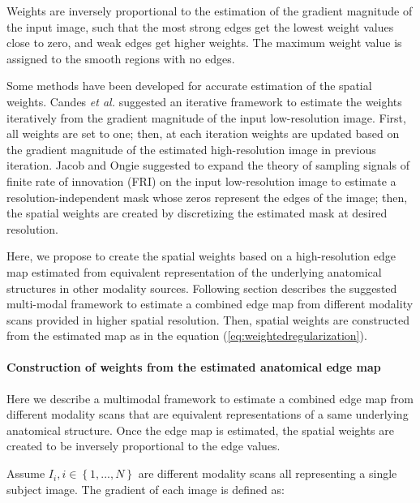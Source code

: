 Weights are inversely proportional to the estimation of the gradient magnitude of the input image, such that the most strong edges get the lowest weight values close to zero, and weak edges get higher weights. The maximum weight value is assigned to the smooth regions with no edges.

Some methods have been developed for accurate estimation of the spatial weights. 
Candes \emph{et al.} \cite{candes2008enhancing} suggested an iterative framework to estimate the weights iteratively from the gradient magnitude of the input low-resolution image. First, all weights are set to one; then, at each iteration weights are updated based on the gradient magnitude of the estimated high-resolution image in previous iteration.
Jacob and Ongie \cite{ongie2015} suggested to expand the theory of sampling signals of finite rate of innovation (FRI) on the input low-resolution image to estimate a resolution-independent mask whose zeros represent the edges of the image; then, the spatial weights are created by discretizing the estimated mask at desired resolution.

Here, we propose to create the spatial weights based on a high-resolution edge map estimated from equivalent representation of the underlying anatomical structures in other modality sources.
Following section describes the suggested multi-modal framework to estimate a combined edge map from different modality scans provided in higher spatial resolution. Then, spatial weights are constructed from the estimated map as in the equation (\ref{eq:weightedregularization}).

\paragraph{Construction of weights from the estimated anatomical edge map}
\label{section:estimateLabelMap}

Here we describe a multimodal framework to estimate a combined edge map from different modality scans that are equivalent representations of a same underlying anatomical structure. Once the edge map is estimated, the spatial weights are created to be inversely proportional to the edge values.

Assume $I_{i}, i\in \left \{ 1,...,N \right \}$ are different modality scans all representing a single subject image. The gradient of each image is defined as:

